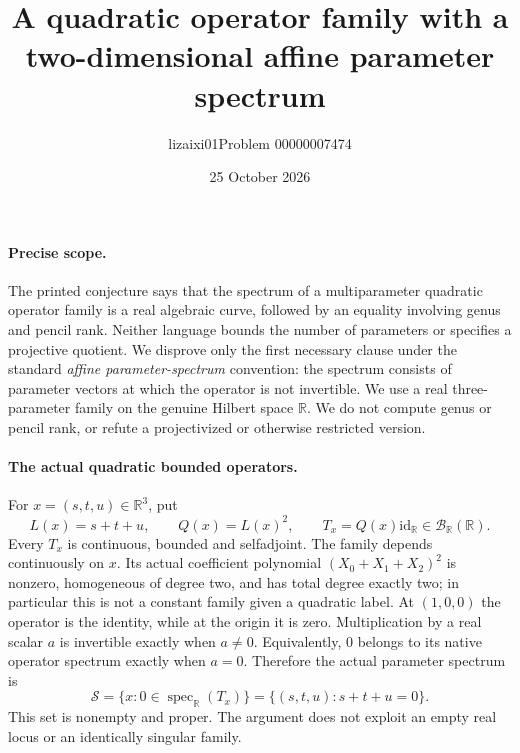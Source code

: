 \documentclass[11pt]{article}
\title{A quadratic operator family with a two-dimensional affine parameter spectrum}
\author{lizaixi01\quad Problem 00000007474}
\date{25 October 2026}
\newcommand{\R}{\mathbb R}
\newcommand{\Specpar}{\mathcal S}
\newcommand{\id}{\mathrm{id}}
\begin{document}
\maketitle
\vspace{-5mm}

\paragraph{Precise scope.}
The printed conjecture says that the spectrum of a multiparameter quadratic
operator family is a real algebraic curve, followed by an equality involving
genus and pencil rank. Neither language bounds the number of parameters or
specifies a projective quotient. We disprove only the first necessary clause
under the standard \emph{affine parameter-spectrum} convention: the spectrum
consists of parameter vectors at which the operator is not invertible.
We use a real three-parameter family on the genuine Hilbert space $\R$.
We do not compute genus or pencil rank, or refute a projectivized or
otherwise restricted version.

\paragraph{The actual quadratic bounded operators.}
For $x=(s,t,u)\in\R^3$, put
\[
 L(x)=s+t+u,\qquad Q(x)=L(x)^2,\qquad
 T_x=Q(x)\id_{\R}\in\mathcal B_{\R}(\R).
\]
Every $T_x$ is continuous, bounded and selfadjoint. The family depends
continuously on $x$. Its actual coefficient polynomial
$(X_0+X_1+X_2)^2$ is nonzero, homogeneous of degree two, and has total
degree exactly two; in particular this is not a constant family given a
quadratic label. At $(1,0,0)$ the operator is the identity, while at the
origin it is zero.
Multiplication by a real scalar $a$ is invertible exactly when $a\ne0$.
Equivalently, $0$ belongs to its native operator spectrum exactly when
$a=0$. Therefore the actual parameter spectrum is
\[
 \Specpar=\{x:0\in\operatorname{spec}_{\R}(T_x)\}
 =\{(s,t,u):s+t+u=0\}.
\]
This set is nonempty and proper. The argument does not exploit an empty
real locus or an identically singular family.
\end{document}
